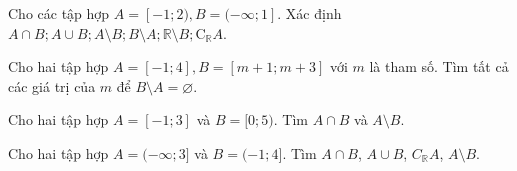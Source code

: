 \begin{bt}%
	Cho các tập hợp $A=[-1; 2), B=(-\infty ; 1]$.
	Xác định $A \cap B ; A \cup B ; A \setminus B ; B \setminus A ; \mathbb{R} \setminus B ; \mathrm{C}_{\mathbb{R}} A$.
	\loigiai{
		$A \cap B=[-1 ; 1] ; A \cup B=(-\infty ; 2) ; A \setminus B=(1 ; 2) ; B \setminus A=(-\infty ;-1).\\
		\mathbb{R} \setminus B=(1 ;+\infty) ; C_{\mathbb{R}} A=(-\infty ;-1) \cup[2 ;+\infty)$
	}
\end{bt}

\begin{bt}%
	Cho hai tập hợp $A=[-1 ; 4], B=[m+1 ; m+3]$ với $m$ là tham số. Tìm tất cả các giá trị của $m$ để $B \setminus A=\varnothing$.
\end{bt}

\begin{bt}%
Cho hai tập hợp $A=[-1;3]$ và $B=[0;5)$. Tìm $A\cap B$ và $A\setminus B$.
\loigiai{
Ta có $A\cap B=[0;3]$ và $A\setminus B=[-1;0)$.
}
\end{bt}

\begin{bt}%
Cho hai tập hợp $A=(-\infty ; 3]$ và $B=(-1 ; 4]$. Tìm $A \cap B$, $A \cup B$, $C_{\mathbb{R}} A$, $A\setminus B$.\\
\loigiai{
$A \cap B=\left( -1;3\right]$; $A \cup B=\left( -\infty;4\right]$; $C_{\mathbb{R}} A=\left(3;+\infty\right)$;  $A\setminus B=\left( -\infty;-1\right]$.
}
\end{bt}

